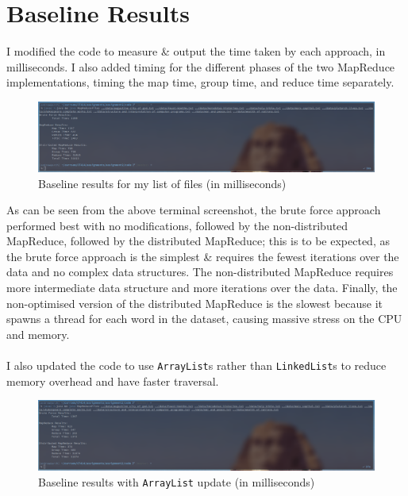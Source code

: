 \documentclass[a4paper]{article}
\begin{document}
\section{Baseline Results}
I modified the code to measure \& output the time taken by each approach, in milliseconds.
I also added timing for the different phases of the two MapReduce implementations, timing the map time, group time, and reduce time separately.

\begin{figure}[H]
    \centering
    \includegraphics[width=\textwidth]{./images/baseline.png}
    \caption{Baseline results for my list of files (in milliseconds)}
\end{figure}

As can be seen from the above terminal screenshot, the brute force approach performed best with no modifications, followed by the non-distributed MapReduce, followed by the distributed MapReduce;
this is to be expected, as the brute force approach is the simplest \& requires the fewest iterations over the data and no complex data structures.
The non-distributed MapReduce requires more intermediate data structure and more iterations over the data.
Finally, the non-optimised version of the distributed MapReduce is the slowest because it spawns a thread for each word in the dataset, causing massive stress on the CPU and memory.
\\\\
I also updated the code to use \texttt{ArrayList}s rather than \texttt{LinkedList}s to reduce memory overhead and have faster traversal.

\begin{figure}[H]
    \centering
    \includegraphics[width=\textwidth]{./images/arraylist.png}
    \caption{Baseline results with \texttt{ArrayList} update (in milliseconds)}
\end{figure}
\end{document}

